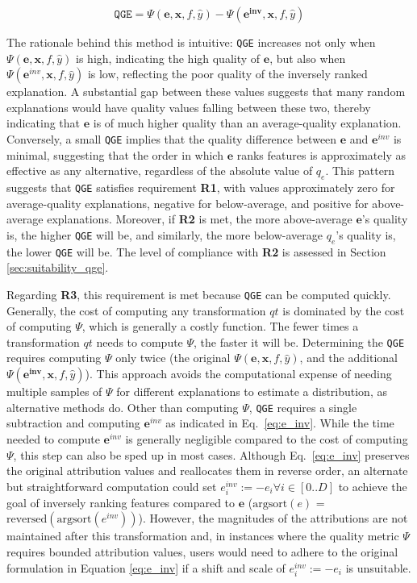 \begin{equation}
\label{eq:qge}
    \texttt{QGE} = \Psi(\mathbf{e}, \mathbf{x}, f, \hat{y}) - \Psi(\mathbf{e^{inv}}, \mathbf{x}, f, \hat{y})
\end{equation}

The rationale behind this method is intuitive: \texttt{QGE} increases not only when $\Psi(\mathbf{e}, \mathbf{x}, f, \hat{y})$ is high, indicating the high quality of $\mathbf{e}$, but also when $\Psi(\mathbf{e}^{inv}, \mathbf{x}, f, \hat{y})$ is low, reflecting the poor quality of the inversely ranked explanation. A substantial gap between these values suggests that many random explanations would have quality values falling between these two, thereby indicating that $\mathbf{e}$ is of much higher quality than an average-quality explanation. Conversely, a small \texttt{QGE} implies that the quality difference between $\mathbf{e}$ and $\mathbf{e}^{inv}$ is minimal, suggesting that the order in which $\mathbf{e}$ ranks features is approximately as effective as any alternative, regardless of the absolute value of $q_e$. This pattern suggests that \texttt{QGE} satisfies requirement \textbf{R1}, with values approximately zero for average-quality explanations, negative for below-average, and positive for above-average explanations. Moreover, if \textbf{R2} is met, the more above-average $\mathbf{e}$'s quality is, the higher \texttt{QGE} will be, and similarly, the more below-average $q_e$'s quality is, the lower \texttt{QGE} will be. The level of compliance with \textbf{R2} is assessed in Section \ref{sec:suitability_qge}.

Regarding \textbf{R3}, this requirement is met because \texttt{QGE} can be computed quickly. Generally, the cost of computing any transformation $qt$ is dominated by the cost of computing $\Psi$, which is generally a costly function. The fewer times a transformation $qt$ needs to compute $\Psi$, the faster it will be. Determining the \texttt{QGE} requires computing $\Psi$ only twice (the original $\Psi(\mathbf{e}, \mathbf{x}, f, \hat{y})$, and the additional $\Psi(\mathbf{e^{inv}}, \mathbf{x}, f, \hat{y})$). This approach avoids the computational expense of needing multiple samples of $\Psi$ for different explanations to estimate a distribution, as alternative methods do. Other than computing $\Psi$, \texttt{QGE} requires a single subtraction and computing $\mathbf{e}^{inv}$ as indicated in Eq.~\ref{eq:e_inv}. While the time needed to compute $\mathbf{e}^{inv}$ is generally negligible compared to the cost of computing $\Psi$, this step can also be sped up in most cases. Although Eq.~\ref{eq:e_inv} preserves the original attribution values and reallocates them in reverse order, an alternate but straightforward computation could set $e_i^{inv} := -e_i \forall i \in [0..D]$ to achieve the goal of inversely ranking features compared to $\mathbf{e}$ ($\text{argsort}(e)$ = $\text{reversed}(\text{argsort}(e^{inv}))$). However, the magnitudes of the attributions are not maintained after this transformation and, in instances where the quality metric $\Psi$ requires bounded attribution values, users would need to adhere to the original formulation in Equation \ref{eq:e_inv} if a shift and scale of $e_i^{inv} := -e_i$ is unsuitable.

